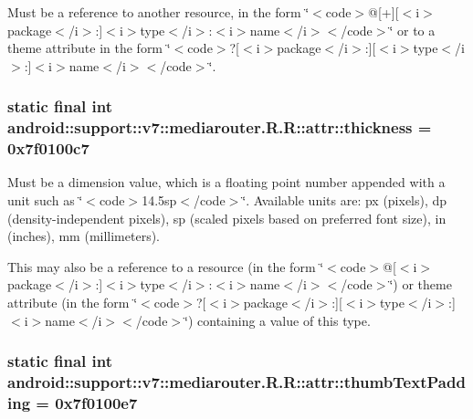 Must be a reference to another resource, in the form \char`\"{}$<$code$>$@\mbox{[}+\mbox{]}\mbox{[}$<$i$>$package$<$/i$>$:\mbox{]}$<$i$>$type$<$/i$>$:$<$i$>$name$<$/i$>$$<$/code$>$\char`\"{} or to a theme attribute in the form \char`\"{}$<$code$>$?\mbox{[}$<$i$>$package$<$/i$>$:\mbox{]}\mbox{[}$<$i$>$type$<$/i$>$:\mbox{]}$<$i$>$name$<$/i$>$$<$/code$>$\char`\"{}. \hypertarget{classandroid_1_1support_1_1v7_1_1mediarouter_1_1_r_1_1attr_8cdbf7deff9390ed5d30f503eb97009f}{
\subsubsection[{thickness}]{\setlength{\rightskip}{0pt plus 5cm}static final int android::support::v7::mediarouter.R.R::attr::thickness = 0x7f0100c7}}
\label{classandroid_1_1support_1_1v7_1_1mediarouter_1_1_r_1_1attr_8cdbf7deff9390ed5d30f503eb97009f}


Must be a dimension value, which is a floating point number appended with a unit such as \char`\"{}$<$code$>$14.5sp$<$/code$>$\char`\"{}. Available units are: px (pixels), dp (density-independent pixels), sp (scaled pixels based on preferred font size), in (inches), mm (millimeters). 

This may also be a reference to a resource (in the form \char`\"{}$<$code$>$@\mbox{[}$<$i$>$package$<$/i$>$:\mbox{]}$<$i$>$type$<$/i$>$:$<$i$>$name$<$/i$>$$<$/code$>$\char`\"{}) or theme attribute (in the form \char`\"{}$<$code$>$?\mbox{[}$<$i$>$package$<$/i$>$:\mbox{]}\mbox{[}$<$i$>$type$<$/i$>$:\mbox{]}$<$i$>$name$<$/i$>$$<$/code$>$\char`\"{}) containing a value of this type. \hypertarget{classandroid_1_1support_1_1v7_1_1mediarouter_1_1_r_1_1attr_c85f112b47b206be1db36a15a43bf885}{
\subsubsection[{thumbTextPadding}]{\setlength{\rightskip}{0pt plus 5cm}static final int android::support::v7::mediarouter.R.R::attr::thumbTextPadding = 0x7f0100e7}}
\label{classandroid_1_1support_1_1v7_1_1mediarouter_1_1_r_1_1attr_c85f112b47b206be1db36a15a43bf885}


